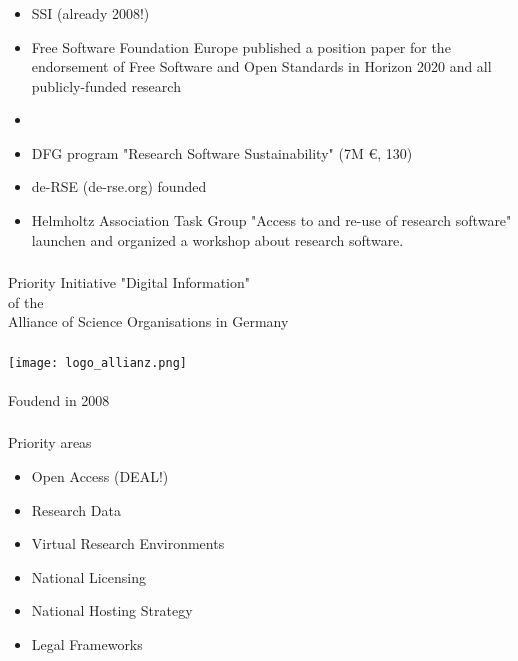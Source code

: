 \documentclass{beamer}
\begin{document}
\begin{frame}
  \frametitle{}
  \begin{block}{}
    \begin{itemize}
    \item SSI (already 2008!)
    \item Free Software Foundation Europe published a position paper
      for the endorsement of Free Software and Open Standards in
      Horizon 2020 and all publicly-funded research
    \item 
    \item DFG program "Research Software Sustainability" (7M €, 130)
    \item de-RSE (de-rse.org) founded
    \item Helmholtz Association Task Group "Access to and re-use of
      research software" launchen and organized a workshop about
      research software.
    \end{itemize}    
  \end{block}
\end{frame}

\begin{frame}
  \frametitle{}
  \begin{center}

    Priority Initiative "Digital Information"\\
    of the\\
    Alliance of Science Organisations in Germany\\
    \ \\
    \texttt{[image: logo\_allianz.png]}\\
    \ \\
    Foudend in 2008
    
  \end{center}
\end{frame}


\begin{frame}
  \frametitle{}
    \begin{block}{}
      \begin{center}
        Priority areas
        \begin{itemize}
        \item Open Access (DEAL!)
        \item Research Data
        \item Virtual Research Environments
        \item National Licensing
        \item National Hosting Strategy
        \item Legal Frameworks
        \end{itemize}
      \end{center}
    \end{block}
\end{frame}
\end{document}
